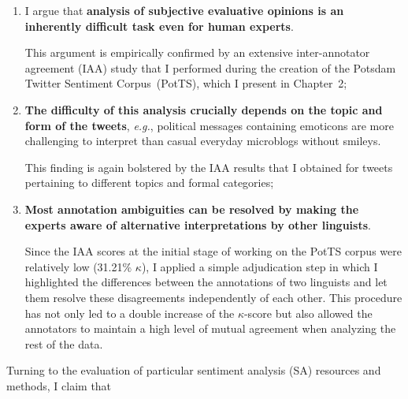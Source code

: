 \documentclass[11pt]{article}
\newcommand{\eg}{\textit{e.g.},}
\begin{document}
\begin{enumerate}
  \item I argue that \textbf{analysis of subjective evaluative
    opinions is an inherently difficult task even for human experts}.

    This argument is empirically confirmed by an extensive
    inter-annotator agreement (IAA) study that I performed during the
    creation of the Potsdam Twitter Sentiment Corpus~(PotTS), which I
    present in Chapter~2;

  \item\textbf{The difficulty of this analysis crucially depends on
    the topic and form of the tweets}, \eg{} political messages
    containing emoticons are more challenging to interpret than casual
    everyday microblogs without smileys.

    This finding is again bolstered by the IAA results that I obtained
    for tweets pertaining to different topics and formal categories;

  \item\textbf{Most annotation ambiguities can be resolved by making
    the experts aware of alternative interpretations by other
    linguists}.

    Since the IAA scores at the initial stage of working on the PotTS
    corpus were relatively low (31.21\% $\kappa$), I applied a simple
    adjudication step in which I highlighted the differences between
    the annotations of two linguists and let them resolve these
    disagreements independently of each other.  This procedure has not
    only led to a double increase of the $\kappa$-score but also
    allowed the annotators to maintain a high level of mutual
    agreement when analyzing the rest of the data.
\end{enumerate}
Turning to the evaluation of particular sentiment analysis (SA)
resources and methods, I claim that
\end{document}
